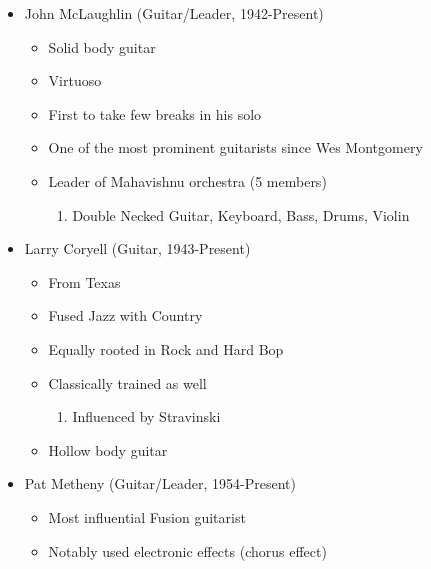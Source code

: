 \documentclass[]{article}
\providecommand{\tightlist}{%
  \setlength{\itemsep}{0pt}\setlength{\parskip}{0pt}}
\begin{document}
\begin{enumerate}
  \begin{itemize}
  \tightlist
  \item
    John McLaughlin (Guitar/Leader, 1942-Present)

    \begin{itemize}
    \tightlist
    \item
      Solid body guitar
    \item
      Virtuoso
    \item
      First to take few breaks in his solo
    \item
      One of the most prominent guitarists since Wes Montgomery
    \item
      Leader of Mahavishnu orchestra (5 members)

      \begin{enumerate}
      \def\labelenumii{\roman{enumii}.}
      \tightlist
      \item
        Double Necked Guitar, Keyboard, Bass, Drums, Violin
      \end{enumerate}
    \end{itemize}
  \item
    Larry Coryell (Guitar, 1943-Present)

    \begin{itemize}
    \tightlist
    \item
      From Texas
    \item
      Fused Jazz with Country
    \item
      Equally rooted in Rock and Hard Bop
    \item
      Classically trained as well

      \begin{enumerate}
      \def\labelenumii{\roman{enumii}.}
      \tightlist
      \item
        Influenced by Stravinski
      \end{enumerate}
    \item
      Hollow body guitar
    \end{itemize}
  \item
    Pat Metheny (Guitar/Leader, 1954-Present)

    \begin{itemize}
    \tightlist
    \item
      Most influential Fusion guitarist
    \item
      Notably used electronic effects (chorus effect)


\end{itemize}
\end{itemize}
\end{enumerate}
\end{document}
